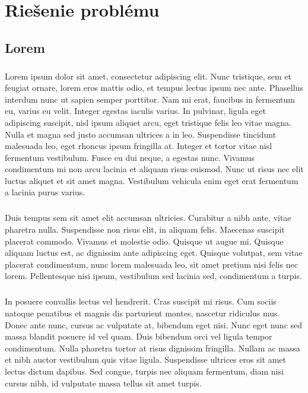 \chapter{Riešenie problému}
\section{Lorem}
\paragraph{}
Lorem ipsum dolor sit amet, consectetur adipiscing elit. Nunc tristique, sem et feugiat ornare, lorem eros mattis odio, et tempus lectus ipsum nec ante. Phasellus interdum nunc ut sapien semper porttitor. Nam mi erat, faucibus in fermentum eu, varius eu velit. Integer egestas iaculis varius. In pulvinar, ligula eget adipiscing suscipit, nisl ipsum aliquet arcu, eget tristique felis leo vitae magna. Nulla et magna sed justo accumsan ultrices a in leo. Suspendisse tincidunt malesuada leo, eget rhoncus ipsum fringilla at. Integer et tortor vitae nisl fermentum vestibulum. Fusce eu dui neque, a egestas nunc. Vivamus condimentum mi non arcu lacinia et aliquam risus euismod. Nunc ut risus nec elit luctus aliquet et sit amet magna. Vestibulum vehicula enim eget erat fermentum a lacinia purus varius.

\paragraph{}
Duis tempus sem sit amet elit accumsan ultricies. Curabitur a nibh ante, vitae pharetra nulla. Suspendisse non risus elit, in aliquam felis. Maecenas suscipit placerat commodo. Vivamus et molestie odio. Quisque ut augue mi. Quisque aliquam luctus est, ac dignissim ante adipiscing eget. Quisque volutpat, sem vitae placerat condimentum, nunc lorem malesuada leo, sit amet pretium nisi felis nec lorem. Pellentesque nisi ipsum, vestibulum sed lacinia sed, condimentum a turpis.

\paragraph{}
In posuere convallis lectus vel hendrerit. Cras suscipit mi risus. Cum sociis natoque penatibus et magnis dis parturient montes, nascetur ridiculus mus. Donec ante nunc, cursus ac vulputate at, bibendum eget nisi. Nunc eget nunc sed massa blandit posuere id vel quam. Duis bibendum orci vel ligula tempor condimentum. Nulla pharetra tortor at risus dignissim fringilla. Nullam ac massa et nibh auctor vestibulum quis vitae ligula. Suspendisse ultrices eros sit amet lectus dictum dapibus. Sed congue, turpis nec aliquam fermentum, diam nisi cursus nibh, id vulputate massa tellus sit amet turpis.
